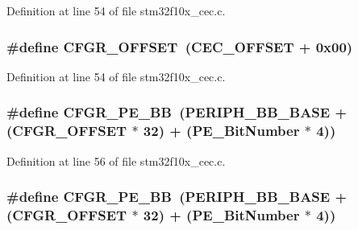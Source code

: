 Definition at line 54 of file stm32f10x\+\_\+cec.\+c.

\subsubsection[{\texorpdfstring{C\+F\+G\+R\+\_\+\+O\+F\+F\+S\+ET}{CFGR_OFFSET}}]{\setlength{\rightskip}{0pt plus 5cm}\#define C\+F\+G\+R\+\_\+\+O\+F\+F\+S\+ET~({\bf C\+E\+C\+\_\+\+O\+F\+F\+S\+ET} + 0x00)}\hypertarget{group___c_e_c___private___defines_ga8682298330c3b9bae1992e4f1a0af985}{}\label{group___c_e_c___private___defines_ga8682298330c3b9bae1992e4f1a0af985}


Definition at line 54 of file stm32f10x\+\_\+cec.\+c.

\subsubsection[{\texorpdfstring{C\+F\+G\+R\+\_\+\+P\+E\+\_\+\+BB}{CFGR_PE_BB}}]{\setlength{\rightskip}{0pt plus 5cm}\#define C\+F\+G\+R\+\_\+\+P\+E\+\_\+\+BB~({\bf P\+E\+R\+I\+P\+H\+\_\+\+B\+B\+\_\+\+B\+A\+SE} + ({\bf C\+F\+G\+R\+\_\+\+O\+F\+F\+S\+ET} $\ast$ 32) + ({\bf P\+E\+\_\+\+Bit\+Number} $\ast$ 4))}\hypertarget{group___c_e_c___private___defines_ga9d1f044508cda5ad8213bd7bc5c4363d}{}\label{group___c_e_c___private___defines_ga9d1f044508cda5ad8213bd7bc5c4363d}


Definition at line 56 of file stm32f10x\+\_\+cec.\+c.

\subsubsection[{\texorpdfstring{C\+F\+G\+R\+\_\+\+P\+E\+\_\+\+BB}{CFGR_PE_BB}}]{\setlength{\rightskip}{0pt plus 5cm}\#define C\+F\+G\+R\+\_\+\+P\+E\+\_\+\+BB~({\bf P\+E\+R\+I\+P\+H\+\_\+\+B\+B\+\_\+\+B\+A\+SE} + ({\bf C\+F\+G\+R\+\_\+\+O\+F\+F\+S\+ET} $\ast$ 32) + ({\bf P\+E\+\_\+\+Bit\+Number} $\ast$ 4))}\hypertarget{group___c_e_c___private___defines_ga9d1f044508cda5ad8213bd7bc5c4363d}{}\label{group___c_e_c___private___defines_ga9d1f044508cda5ad8213bd7bc5c4363d}


